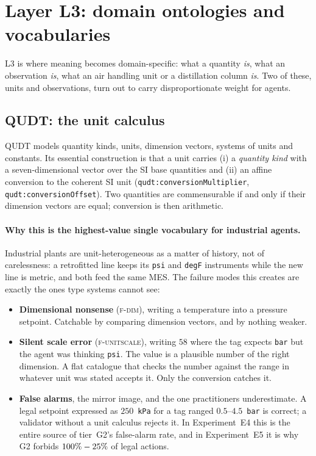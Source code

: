 \section{Layer L3: domain ontologies and vocabularies}
\label{sec:layer3}

L3 is where meaning becomes domain-specific: what a quantity \emph{is}, what an
observation \emph{is}, what an air handling unit or a distillation column
\emph{is}. Two of these, units and observations, turn out to carry
disproportionate weight for agents.

\subsection{QUDT: the unit calculus}
\label{sec:qudt}

QUDT \cite{qudt} models quantity kinds, units, dimension vectors, systems of
units and constants. Its essential construction is that a unit carries
(i) a \emph{quantity kind} with a seven-dimensional vector over the SI base
quantities and (ii) an affine conversion to the coherent SI unit
(\texttt{qudt:conversionMultiplier}, \texttt{qudt:conversionOffset}). Two
quantities are commensurable if and only if their dimension vectors are equal;
conversion is then arithmetic.

\paragraph{Why this is the highest-value single vocabulary for industrial
agents.} Industrial plants are unit-heterogeneous as a matter of history, not of
carelessness: a retrofitted line keeps its \texttt{psi} and \texttt{degF}
instruments while the new line is metric, and both feed the same MES. The
failure modes this creates are exactly the ones type systems cannot see:

\begin{itemize}
  \item \textbf{Dimensional nonsense} (\textsc{f-dim}), writing a temperature
  into a pressure setpoint. Catchable by comparing dimension vectors, and by
  nothing weaker.
  \item \textbf{Silent scale error} (\textsc{f-unitscale}), writing $58$ where
  the tag expects \texttt{bar} but the agent was thinking \texttt{psi}. The value
  is a plausible number of the right dimension. A flat catalogue that checks the
  number against the range in whatever unit was stated accepts it. Only the
  conversion catches it.
  \item \textbf{False alarms}, the mirror image, and the one practitioners
  underestimate. A legal setpoint expressed as $250$~\texttt{kPa} for a tag
  ranged $0.5$--$4.5$~\texttt{bar} is correct; a validator without a unit
  calculus rejects it. In Experiment~E4 this is the entire source of tier~G2's
  \FPRGTwo{} false-alarm rate, and in Experiment~E5 it is why G2 forbids
  $100\% - 25\%{}$ of legal actions.
\end{itemize}

